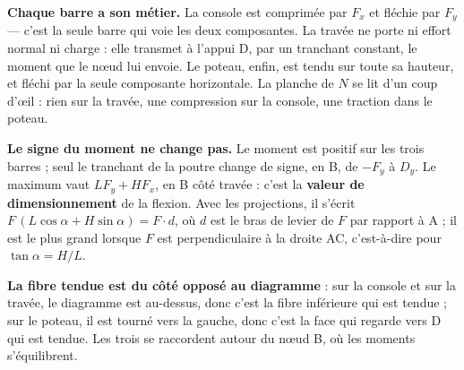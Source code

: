 \begin{minipage}[t]{0.333\textwidth}
\par\vspace{6bp}
\end{minipage}


\textbf{Chaque barre a son métier.} La console est comprimée par $F_x$ et fléchie par $F_y$ — c'est la seule barre qui voie les deux composantes. La travée ne porte ni effort normal ni charge : elle transmet à l'appui D, par un tranchant constant, le moment que le nœud lui envoie. Le poteau, enfin, est tendu sur toute sa hauteur, et fléchi par la seule composante horizontale. La planche de $N$ se lit d'un coup d'œil : rien sur la travée, une compression sur la console, une traction dans le poteau.

\textbf{Le signe du moment ne change pas.} Le moment est positif sur les trois barres ; seul le tranchant de la poutre change de signe, en B, de $-F_y$ à $D_y$. Le maximum vaut $LF_y + HF_x$, en B côté travée : c'est la \textbf{valeur de dimensionnement} de la flexion. Avec les projections, il s'écrit $F\,(L\cos\alpha + H\sin\alpha) = F\cdot d$, où $d$ est le bras de levier de $F$ par rapport à A ; il est le plus grand lorsque $F$ est perpendiculaire à la droite AC, c'est-à-dire pour $\tan\alpha = H/L$.

\textbf{La fibre tendue est du côté opposé au diagramme} : sur la console et sur la travée, le diagramme est au-dessus, donc c'est la fibre inférieure qui est tendue ; sur le poteau, il est tourné vers la gauche, donc c'est la face qui regarde vers D qui est tendue. Les trois se raccordent autour du nœud B, où les moments s'équilibrent.

